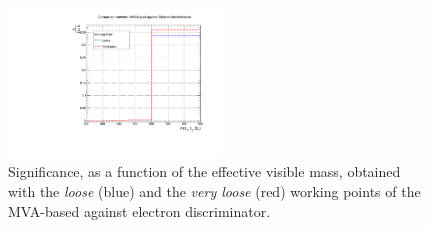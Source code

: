  \begin{tiny} 
 \begin{table}[ht] 
 \caption{Signal and background yields obtained using the \textit{loose} and \textit{very loose} WPs for the MVA-based 
 against electron discriminator. The significance was estimated for 
  \mass~$>~$600\GeV. \label{tab:electronappendix} }
 \end{table} 
 \end{tiny} 
 
 
\begin{figure}[ht]
\begin{center}
\captionsetup[subfloat]{farskip=0pt,captionskip=0.0cm,labelformat=empty}
\includegraphics[clip,width=0.5\textwidth]{figuras/AppendiceB/againstElectronWP/againstElectron.pdf}
\caption{Significance, as a function of the effective visible mass, obtained with the 
\textit{loose} (blue) and the \textit{very loose} (red) working points of the MVA-based against electron discriminator. \label{fig:electronappendix}}
\end{center}
\end{figure}


